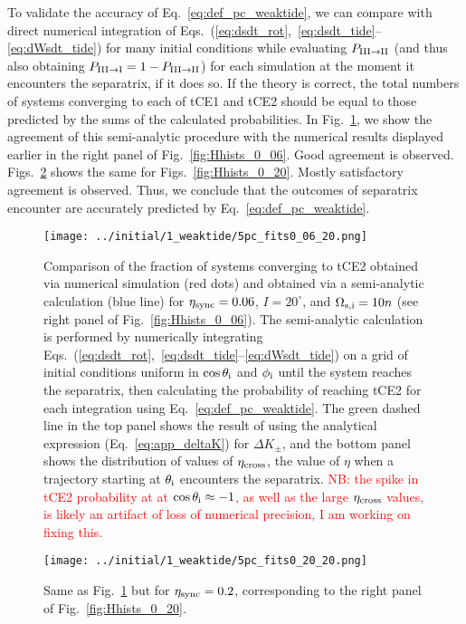 \documentclass[
        fleqn,
        usenatbib,
    ]{mnras}
\begin{document}
To validate the accuracy of Eq.~\eqref{eq:def_pc_weaktide}, we can compare with
direct numerical integration of
Eqs.~(\ref{eq:dsdt_rot},~\ref{eq:dsdt_tide}--\ref{eq:dWsdt_tide}) for many
initial conditions while evaluating $P_{\rm III \to II}$ (and thus also
obtaining $P_{\rm III \to I} = 1 - P_{\rm III \to II}$) for each simulation at
the moment it encounters the separatrix, if it does so. If the theory is
correct, the total numbers of systems converging to each of tCE1 and tCE2 should
be equal to those predicted by the sums of the calculated probabilities. In
Fig.~\ref{fig:pc_fits_0_06}, we show the agreement of this semi-analytic
procedure with the numerical results displayed earlier in the right panel of
Fig.~\ref{fig:Hhists_0_06}. Good agreement is observed.
Figs.~\ref{fig:pc_fits_0_20} shows the same for Figs.~\ref{fig:Hhists_0_20}.
Mostly satisfactory agreement is observed. Thus, we conclude that the outcomes
of separatrix encounter are accurately predicted by
Eq.~\eqref{eq:def_pc_weaktide}.
\begin{figure}
    \centering
    \texttt{[image: ../initial/1\_weaktide/5pc\_fits0\_06\_20.png]}
    \caption{Comparison of the fraction of systems converging to tCE2 obtained
    via numerical simulation (red dots) and obtained via a semi-analytic
    calculation (blue line) for $\eta_{\rm sync} = 0.06$, $I = 20^\circ$, and
    $\Omega_{\rm s, i} = 10n$ (see right panel of Fig.~\ref{fig:Hhists_0_06}).
    The semi-analytic calculation is performed by numerically integrating
    Eqs.~(\ref{eq:dsdt_rot},~\ref{eq:dsdt_tide}--\ref{eq:dWsdt_tide}) on a grid
    of initial conditions uniform in $\cos \theta_{\rm i}$ and $\phi_{\rm i}$
    until the system reaches the separatrix, then calculating the probability of
    reaching tCE2 for each integration using Eq.~\eqref{eq:def_pc_weaktide}. The
    green dashed line in the top panel shows the result of using the analytical
    expression (Eq.~\ref{eq:app_deltaK}) for $\Delta K_{\pm}$, and the bottom
    panel shows the distribution of values of $\eta_{\rm cross}$, the value of
    $\eta$ when a trajectory starting at $\theta_{\rm i}$ encounters the
    separatrix.
    \textcolor{red}{NB\@: the spike in tCE2 probability at at $\cos
    \theta_{\rm i} \approx -1$, as well as the large $\eta_{\rm cross}$ values,
    is likely an artifact of loss of numerical precision, I am working on fixing
    this.}
    }\label{fig:pc_fits_0_06}
\end{figure}
\begin{figure}
    \centering
    \texttt{[image: ../initial/1\_weaktide/5pc\_fits0\_20\_20.png]}
    \caption{Same as Fig.~\ref{fig:pc_fits_0_06} but for $\eta_{\rm sync} =
    0.2$, corresponding to the right panel of
    Fig.~\ref{fig:Hhists_0_20}.}\label{fig:pc_fits_0_20}
\end{figure}
\end{document}
